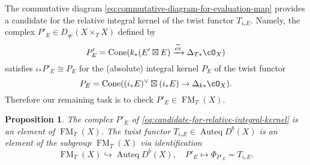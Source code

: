 \documentclass{amsart}
\numberwithin{equation}{section}
\theoremstyle{plain}
\newtheorem{proposition}[theorem]{Proposition}
\theoremstyle{definition}
\DeclareMathOperator{\Auteq}{\mathrm{Auteq}}
\DeclareMathOperator{\Cone}{\mathrm{Cone}}
\DeclareMathOperator{\ev}{\mathrm{ev}}
\DeclareMathOperator{\FM}{\mathrm{FM}}
\begin{document}
The commutative diagram \eqref{eq:commutative-diagram-for-evaluation-map} provides a candidate for the relative integral kernel of the twist functor $T_{i_*E}$.
Namely, the complex $P'_E \in D_{qc}(X \times_T X)$ defined by
\begin{equation}\label{eq:candidate-for-relative-integral-kernel}
    P'_E = \Cone(k_*(E' \boxtimes E) \xrightarrow{\widetilde{\ev}} \Delta_{T*}\cO_X)
\end{equation}
satisfies $\iota_*P'_E \cong P_E$ for the (absolute) integral kernel $P_E$ of the twist functor
\begin{equation}
    P_E = \Cone((i_*E)^\vee \boxtimes (i_*E) \to \Delta_{k*}\cO_X).
\end{equation}
Therefore our remaining task is to check $P'_E \in \FM_T(X)$.
\begin{proposition}\label{prop:twist-functor-is-in-FM}
    The complex $P'_E$ of \eqref{eq:candidate-for-relative-integral-kernel} is an element of $\FM_T(X)$.
    The twist functor $T_{i_*E} \in \Auteq D^b(X)$ is an element of the subgroup $\FM_T(X)$ via identification
    \begin{equation}
        \FM_T(X) \hookrightarrow \Auteq D^b(X), \quad P'_E \mapsto \Phi_{P'_E} = T_{i_*E}.
    \end{equation}
\end{proposition}
\end{document}
